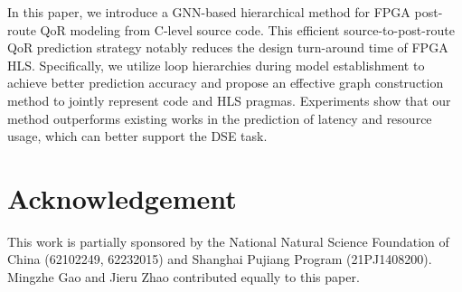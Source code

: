 \documentclass[conference]{IEEEtran}
\begin{document}
In this paper, we introduce a GNN-based hierarchical method for FPGA post-route QoR modeling from C-level source code.
This efficient source-to-post-route QoR prediction strategy notably reduces the design turn-around time of FPGA HLS. Specifically, we utilize loop hierarchies during model establishment to achieve better prediction accuracy and propose an effective graph construction method to jointly represent code and HLS pragmas. Experiments show that our method outperforms existing works in the prediction of latency and resource usage, which can better support the DSE task.



\vspace{-0.1cm} 
\section*{Acknowledgement}
\vspace{-0.1cm} 
This work is partially sponsored by the National Natural Science Foundation of China (62102249, 62232015) and Shanghai Pujiang Program (21PJ1408200). Mingzhe Gao and Jieru Zhao contributed equally to this paper.



\vspace{-0.1cm} 




\end{document}
